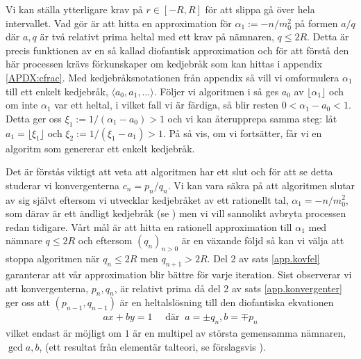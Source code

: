 Vi kan ställa ytterligare krav på \(r \in [-R, R]\) för att slippa gå över hela intervallet. Vad \cite{HaraldSieve} gör är att hitta en approximation för \(\alpha_1 := -n/m_0^2\) på formen \(a/q\) där $a,q$ är två relativt prima heltal med ett krav på nämnaren, $q \leq 2R$. Detta är precis funktionen av en så kallad diofantisk approximation och för att förstå den här processen krävs förkunskaper om kedjebråk som kan hittas i appendix \ref{APDX:cfrac}. Med kedjebråksnotationen från appendix så vill vi omformulera \(\alpha_1\) till ett enkelt kedjebråk, \(\langle a_0, a_1, \dots \rangle\). Följer vi algoritmen i \cite[Sats 21.5]{Lindahl} så ges \(a_0\) av \(\lfloor \alpha_1 \rfloor\) och om inte \(\alpha_1\) var ett heltal, i vilket fall vi är färdiga, så blir resten \(0 < \alpha_1 - a_0 < 1\). Detta ger oss \(\xi_1 := 1 / (\alpha_1 - a_0) > 1\) och vi kan återupprepa samma steg: låt \(a_1 = \lfloor \xi_1 \rfloor\) och \(\xi_2 := 1 / (\xi_1 - a_1) > 1\). På så vis, om vi fortsätter, får vi en algoritm som genererar ett enkelt kedjebråk. 

Det är förstås viktigt att veta att algoritmen har ett slut och för att se detta studerar vi konvergenterna \(c_n = p_n / q_n\). Vi kan vara säkra på att algoritmen slutar av sig självt eftersom vi utvecklar kedjebråket av ett rationellt tal, \(\alpha_1 = - n / m_0^2\), som därav är ett ändligt kedjebråk (se \cite[Sats 21.5]{Lindahl}) men vi vill sannolikt avbryta processen redan tidigare. Vårt mål är att hitta en rationell approximation till \(\alpha_1\) med nämnare \(q \leq 2R\) och eftersom \((q_n)_{n>0}\) är en växande följd så kan vi välja att stoppa algoritmen när \(q_n \leq 2 R\) men \(q_{n + 1} > 2R\). Del 2 av sats \ref{app.kovfel} garanterar att vår approximation blir bättre för varje iteration. Sist observerar vi att konvergenterna, \(p_n, q_n\), är relativt prima då del 2 av sats \ref{app.konvergenter} ger oss att \((p_{n-1}, q_{n-1})\) är en heltalslösning till den diofantiska ekvationen
\begin{align*}
    a x + b y = 1 \quad \text{ där }\ a = \pm q_n, b = \mp p_n
\end{align*}
vilket endast är möjligt om \(1\) är en multipel av största gemensamma nämnaren, \(\gcd{a,b}\), (ett resultat från elementär talteori, se förslagsvis \cite[Sats 3.1]{Lindahl}). %

